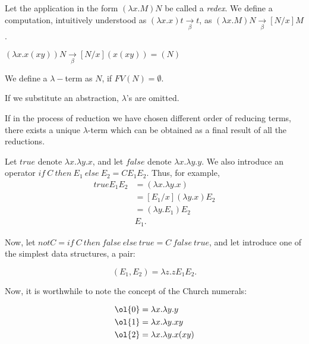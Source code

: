 \documentclass[11pt]{scrartcl}
\begin{document}
  Let the application in the form $(\lambda x. M)N$ be called a
  \textit{redex}. We define a computation, intuitively understood as
  $(\lambda x.x)t \underset{\beta}{\to} t$, as
  $(\lambda x. M)N \underset{\beta}{\to} [N / x]M$.

  \begin{example}

    $(\lambda x. x(xy))N \underset{\beta}{\to} [N/x](x(xy)) = (N)$

  \end{example}

  We define a $\lambda-$term as $N$, if $FV(N) = \emptyset$.

  If we substitute an abstraction, $\lambda$'s are omitted.

  \begin{theorem}
    If in the process of reduction we have chosen different order of
    reducing terms, there exists a unique $\lambda$-term which can be
    obtained as a final result of all the reductions.
  \end{theorem}

  Let $true$ denote $\lambda x. \lambda y. x$, and let $false$ denote
  $\lambda x. \lambda y. y$. We also introduce an operator
  $if\ C\ then\ E_{1}\ else\ E_{2} = CE_{1}E_{2}$. Thus, for example,
  \begin{align}
    true E_{1} E_{2} &= (\lambda x.\lambda y.x)\\
                     &= [E_{1} / x](\lambda y.x) E_{2}\\
                     &= (\lambda y. E_{1})E_{2}\\
                     & E_{1}.
  \end{align}

  Now, let $not C = if\ C\ then\ false \ else \ true = C\ false \ true
  $, and let introduce one of the simplest data structures, a pair:

  
  \begin{equation*}
    (E_{1}, E_{2}) = \lambda z.z E_{1}E_{2}.
  \end{equation*}

  Now, it is worthwhile to note the concept of the Church numerals:

  \begin{align}
    \ol{0} &= \lambda x.\lambda y. y\\
    \ol{1} &= \lambda x. \lambda y. xy\\
    \ol{2} &=\lambda x. \lambda y. x(xy)
  \end{align}
    
\end{document}
